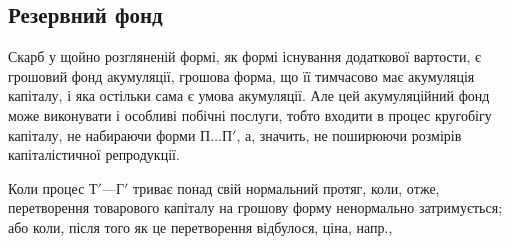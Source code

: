 \subsection{Резервний фонд}

Скарб у щойно розгляненій формі, як формі існування додаткової
вартости, є грошовий фонд акумуляції, грошова форма, що її тимчасово
має акумуляція капіталу, і яка остільки сама є умова акумуляції.
Але цей акумуляційний фонд може виконувати і особливі побічні послуги,
тобто входити в процес кругобігу капіталу, не набираючи форми $П\dots{}П'$,
а, значить, не поширюючи розмірів капіталістичної репродукції.

Коли процес $Т' — Г'$ триває понад свій нормальний протяг, коли, отже,
перетворення товарового капіталу на грошову форму ненормально затримується;
або коли, після того як це перетворення відбулося, ціна, напр.,
\parbreak{}  %

